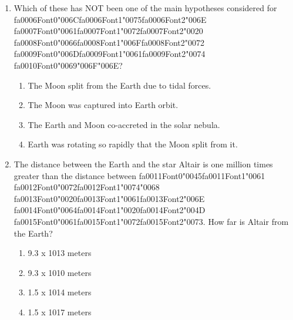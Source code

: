 \documentclass[12pt]{article}
\begin{document}
\begin{enumerate}[label=\arabic*.]
\begin{enumerate}[label=(\alph*)]
    \item Radar from the earth can only see Mercury's poles.
    \item These craters contain the only permanently shadowed regions on Mercury
\end{enumerate}
\item Which of these has NOT been one of the main hypotheses considered for {\csname fa0006Font0\endcsname\char"006C}{\csname fa0006Font1\endcsname\char"0075}{\csname fa0006Font2\endcsname\char"006E} {\csname fa0007Font0\endcsname\char"0061}{\csname fa0007Font1\endcsname\char"0072}{\csname fa0007Font2\endcsname\char"0020} {\csname fa0008Font0\endcsname\char"0066}{\csname fa0008Font1\endcsname\char"006F}{\csname fa0008Font2\endcsname\char"0072} {\csname fa0009Font0\endcsname\char"006D}{\csname fa0009Font1\endcsname\char"0061}{\csname fa0009Font2\endcsname\char"0074}
{\csname fa0010Font0\endcsname\char"0069}{\char"006F}{\char"006E}?
\begin{enumerate}[label=(\alph*)]
    \item The Moon split from the Earth due to tidal forces.
    \item The Moon was captured into Earth orbit.
    \item The Earth and Moon co-accreted in the solar nebula.
    \item Earth was rotating so rapidly that the Moon split from it.
\end{enumerate}
\item The distance between the Earth and the star Altair is one million times greater than the
distance between {\csname fa0011Font0\endcsname\char"0045}{\csname fa0011Font1\endcsname\char"0061} {\csname fa0012Font0\endcsname\char"0072}{\csname fa0012Font1\endcsname\char"0074}{\char"0068} {\csname fa0013Font0\endcsname\char"0020}{\csname fa0013Font1\endcsname\char"0061}{\csname fa0013Font2\endcsname\char"006E} {\csname fa0014Font0\endcsname\char"0064}{\csname fa0014Font1\endcsname\char"0020}{\csname fa0014Font2\endcsname\char"004D} {\csname fa0015Font0\endcsname\char"0061}{\csname fa0015Font1\endcsname\char"0072}{\csname fa0015Font2\endcsname\char"0073}. How far is Altair from the Earth?
\begin{enumerate}[label=(\alph*)]
    \item 9.3 x 1013 meters
    \item 9.3 x 1010 meters
    \item 1.5 x 1014 meters
    \item 1.5 x 1017 meters
\end{enumerate}

\end{enumerate}
\end{document}
